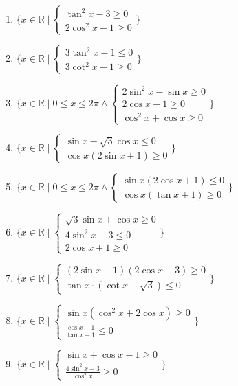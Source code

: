 \documentclass[11pt,a4paper]{article}
\begin{document}
\begin{enumerate}
\item $\displaystyle \{x \in \mathbb{R} \mid \begin{cases} \tan^{2} x - 3 \ge 0 \\ 2\cos^{2} x - 1 \ge 0 \end{cases}\}$
\item $\displaystyle \{x \in \mathbb{R} \mid \begin{cases} 3\tan^{2} x - 1 \le 0 \\ 3\cot^{2} x - 1 \ge 0 \end{cases}\}$
\item $\displaystyle \{x \in \mathbb{R} \mid 0 \le x \le 2\pi \land \begin{cases} 2\sin^{2} x - \sin x \ge 0 \\ 2\cos x - 1 \ge 0 \\ \cos^{2} x + \cos x \ge 0 \end{cases}\}$
\item $\displaystyle \{x \in \mathbb{R} \mid \begin{cases} \sin x - \sqrt{3}\cos x \le 0 \\ \cos x(2\sin x + 1) \ge 0 \end{cases}\}$
\item $\displaystyle \{x \in \mathbb{R} \mid 0 \le x \le 2\pi \land \begin{cases} \sin x(2\cos x + 1) \le 0 \\ \cos x(\tan x + 1) \ge 0 \end{cases}\}$
\item $\displaystyle \{x \in \mathbb{R} \mid \begin{cases} \sqrt{3}\sin x + \cos x \ge 0 \\ 4\sin^{2} x - 3 \le 0 \\ 2\cos x + 1 \ge 0 \end{cases}\}$
\item $\displaystyle \{x \in \mathbb{R} \mid \begin{cases} (2\sin x - 1)(2\cos x + 3) \ge 0 \\ \tan x \cdot (\cot x - \sqrt{3}) \le 0 \end{cases}\}$
\item $\displaystyle \{x \in \mathbb{R} \mid \begin{cases} \sin x(\cos^{2} x + 2\cos x) \ge 0 \\ \frac{\cos x + 1}{\tan x - 1} \le 0 \end{cases}\}$
\item $\displaystyle \{x \in \mathbb{R} \mid \begin{cases} \sin x + \cos x - 1 \ge 0 \\ \frac{4\sin^{2} x - 3}{\cos^{2} x} \ge 0 \end{cases}\}$

\end{enumerate}
\end{document}
